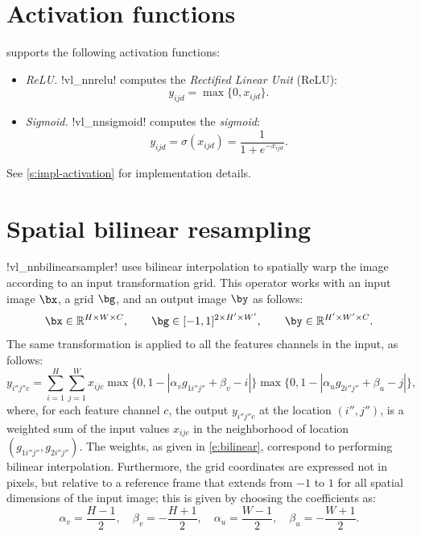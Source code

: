 \section{Activation functions}\label{s:activation}

\matconvnet supports the following activation functions:
%
\begin{itemize}
\item \emph{ReLU.} !vl_nnrelu! computes the \emph{Rectified Linear Unit} (ReLU):
\[
 y_{ijd} = \max\{0, x_{ijd}\}.
\]

\item \emph{Sigmoid.} !vl_nnsigmoid! computes the \emph{sigmoid}:
\[
 y_{ijd} = \sigma(x_{ijd}) = \frac{1}{1+e^{-x_{ijd}}}.
\]
\end{itemize}
%
See \cref{s:impl-activation} for implementation details.

\section{Spatial bilinear resampling}\label{s:spatial-sampler}

!vl_nnbilinearsampler! uses bilinear interpolation to spatially warp the image according to an input transformation grid. This operator works with an input image $\bx$, a grid $\bg$, and an output image $\by$ as follows:
\[
  \bx \in \mathbb{R}^{H \times W \times C},
  \qquad
  \bg \in [-1,1]^{2 \times H' \times W'},
  \qquad
  \by \in \mathbb{R}^{H' \times W' \times C}.
\]
The same transformation is applied to all the features channels in the input, as follows:
\begin{equation}\label{e:bilinear}
  y_{i''j''c}
  =
  \sum_{i=1}^H
  \sum_{j=1}^W
  x_{ijc}
  \max\{0, 1-|\alpha_v g_{1i''j''} + \beta_v - i|\}
  \max\{0, 1-|\alpha_u g_{2i''j''} + \beta_u - j|\},
\end{equation}
where, for each feature channel $c$, the output $y_{i''j''c}$ at the location $(i'',j'')$, is a weighted sum of the input values $x_{ijc}$ in the neighborhood of location $(g_{1i''j''},g_{2i''j''})$. The weights, as given in \eqref{e:bilinear}, correspond to performing bilinear interpolation. Furthermore, the grid coordinates are expressed not in pixels, but relative to a reference frame that extends from $-1$ to $1$ for all spatial dimensions of the input image; this is given by choosing the coefficients as:
\[
\alpha_v = \frac{H-1}{2},\quad
\beta_v = -\frac{H+1}{2},\quad
\alpha_u = \frac{W-1}{2},\quad
\beta_u = -\frac{W+1}{2}.
\]

